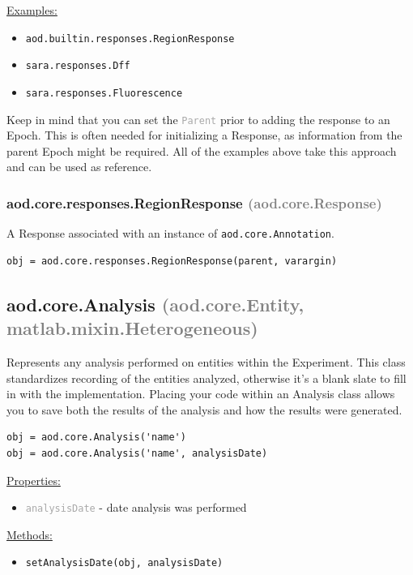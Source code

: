 \documentclass[10pt]{exam}
\newcommand\myparent[1]{\textcolor{gray}{(#1)}}
\newcommand\aodclass[1]{\textcolor{codeblue}{\texttt{#1}}}
\newcommand\aodprop[1]{\textcolor{darkgray}{\texttt{#1}}}
\newcommand\aodfcn[1]{\textcolor{darkteal}{\texttt{#1}}}
\newcommand\docheader[1]{\vspace{0.6ex}\noindent\underline{#1}\vspace{0.15ex}}
\begin{document}
		\docheader{Examples:}
		\begin{itemize}
			\item \aodclass{aod.builtin.responses.RegionResponse}
			\item \aodclass{sara.responses.Dff}
			\item \aodclass{sara.responses.Fluorescence}
		\end{itemize}
		\noindent Keep in mind that you can set the \aodprop{Parent} prior to adding the response to an Epoch. This is often needed for initializing a Response, as information from the parent Epoch might be required. All of the examples above take this approach and can be used as reference.
		
		\subsubsection{aod.core.responses.RegionResponse \myparent{aod.core.Response}}
			\noindent A Response associated with an instance of \aodclass{aod.core.Annotation}.
			\begin{lstlisting}[style=matlab-editor, basicstyle=\mlttfamily\footnotesize]
obj = aod.core.responses.RegionResponse(parent, varargin)
			\end{lstlisting}
	
	\subsection{aod.core.Analysis \myparent{aod.core.Entity, matlab.mixin.Heterogeneous}} 
		\noindent Represents any analysis performed on entities within the Experiment. This class standardizes recording of the entities analyzed, otherwise it's a blank slate to fill in with the implementation. Placing your code within an Analysis class allows you to save both the results of the analysis and how the results were generated.
		\begin{lstlisting}[style=matlab-editor, basicstyle=\mlttfamily\footnotesize]
obj = aod.core.Analysis('name')
obj = aod.core.Analysis('name', analysisDate)
		\end{lstlisting}
		\docheader{Properties:}
		\begin{itemize}
			\item \aodprop{analysisDate} - date analysis was performed
		\end{itemize}
		\docheader{Methods:}
		\begin{itemize}
			\item \aodfcn{setAnalysisDate(obj, analysisDate)}
		\end{itemize}			
\end{document}
